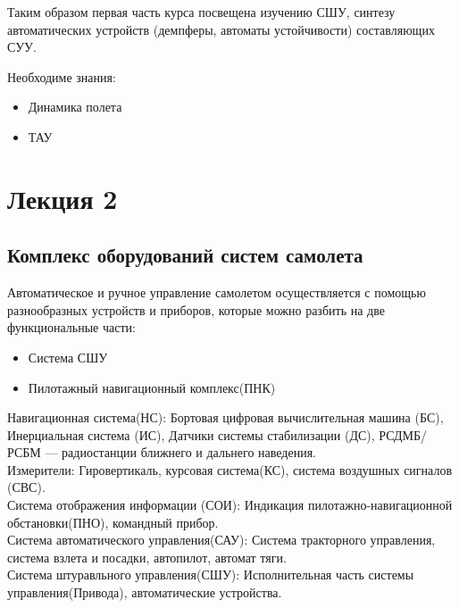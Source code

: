\documentclass{article}
\begin{document}
Таким образом первая часть курса посвещена изучению СШУ, синтезу автоматических устройств (демпферы, автоматы устойчивости) составляющих СУУ.

Необходиме знания:
\begin{itemize}
  \item Динамика полета
  \item ТАУ
\end{itemize}
\newpage

\section{Лекция 2}
\subsection{Комплекс оборудований систем самолета}

Автоматическое и ручное управление самолетом осуществляется с помощью разнообразных устройств и приборов, которые можно разбить на две функциональные части:
\begin{itemize}
\item{Система СШУ}
\item{Пилотажный навигационный комплекс(ПНК)}
\end{itemize}

Навигационная система(НС): Бортовая цифровая вычислительная машина (БС), Инерциальная система (ИС), Датчики системы стабилизации (ДС), РСДМБ/РСБМ --- радиостанции ближнего и дальнего наведения. \\
Измерители: Гировертикаль, курсовая система(КС), система воздушных сигналов (СВС).\\
Система отображения информации (СОИ): Индикация пилотажно-навигационной обстановки(ПНО), командный прибор.\\
Система автоматического управления(САУ): Система тракторного управления, система взлета и посадки, автопилот, автомат тяги.\\
Система штуравльного управления(СШУ): Исполнительная часть системы управления(Привода), автоматические устройства.
\end{document}
